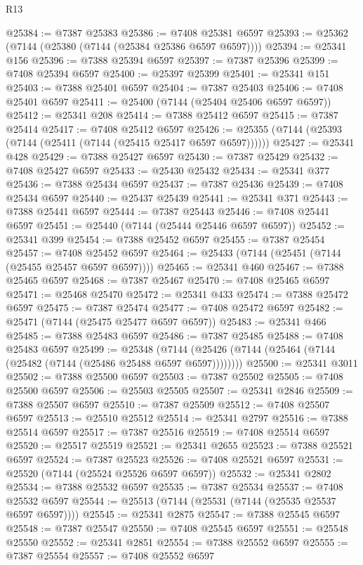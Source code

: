 \begin{lexlean}{R13}
\begin{coremodule}
@25384 := @7387 @25383
@25386 := @7408 @25381 @6597
@25393 := @25362 (@7144 (@25380 (@7144 (@25384 @25386 @6597 @6597))))
@25394 := @25341 @156
@25396 := @7388 @25394 @6597
@25397 := @7387 @25396
@25399 := @7408 @25394 @6597
@25400 := @25397 @25399
@25401 := @25341 @151
@25403 := @7388 @25401 @6597
@25404 := @7387 @25403
@25406 := @7408 @25401 @6597
@25411 := @25400 (@7144 (@25404 @25406 @6597 @6597))
@25412 := @25341 @208
@25414 := @7388 @25412 @6597
@25415 := @7387 @25414
@25417 := @7408 @25412 @6597
@25426 := @25355 (@7144 (@25393 (@7144 (@25411 (@7144 (@25415 @25417 @6597 @6597))))))
@25427 := @25341 @428
@25429 := @7388 @25427 @6597
@25430 := @7387 @25429
@25432 := @7408 @25427 @6597
@25433 := @25430 @25432
@25434 := @25341 @377
@25436 := @7388 @25434 @6597
@25437 := @7387 @25436
@25439 := @7408 @25434 @6597
@25440 := @25437 @25439
@25441 := @25341 @371
@25443 := @7388 @25441 @6597
@25444 := @7387 @25443
@25446 := @7408 @25441 @6597
@25451 := @25440 (@7144 (@25444 @25446 @6597 @6597))
@25452 := @25341 @399
@25454 := @7388 @25452 @6597
@25455 := @7387 @25454
@25457 := @7408 @25452 @6597
@25464 := @25433 (@7144 (@25451 (@7144 (@25455 @25457 @6597 @6597))))
@25465 := @25341 @460
@25467 := @7388 @25465 @6597
@25468 := @7387 @25467
@25470 := @7408 @25465 @6597
@25471 := @25468 @25470
@25472 := @25341 @433
@25474 := @7388 @25472 @6597
@25475 := @7387 @25474
@25477 := @7408 @25472 @6597
@25482 := @25471 (@7144 (@25475 @25477 @6597 @6597))
@25483 := @25341 @466
@25485 := @7388 @25483 @6597
@25486 := @7387 @25485
@25488 := @7408 @25483 @6597
@25499 := @25348
    (@7144 (@25426 (@7144 (@25464 (@7144 (@25482 (@7144 (@25486 @25488 @6597 @6597))))))))
@25500 := @25341 @3011
@25502 := @7388 @25500 @6597
@25503 := @7387 @25502
@25505 := @7408 @25500 @6597
@25506 := @25503 @25505
@25507 := @25341 @2846
@25509 := @7388 @25507 @6597
@25510 := @7387 @25509
@25512 := @7408 @25507 @6597
@25513 := @25510 @25512
@25514 := @25341 @2797
@25516 := @7388 @25514 @6597
@25517 := @7387 @25516
@25519 := @7408 @25514 @6597
@25520 := @25517 @25519
@25521 := @25341 @2655
@25523 := @7388 @25521 @6597
@25524 := @7387 @25523
@25526 := @7408 @25521 @6597
@25531 := @25520 (@7144 (@25524 @25526 @6597 @6597))
@25532 := @25341 @2802
@25534 := @7388 @25532 @6597
@25535 := @7387 @25534
@25537 := @7408 @25532 @6597
@25544 := @25513 (@7144 (@25531 (@7144 (@25535 @25537 @6597 @6597))))
@25545 := @25341 @2875
@25547 := @7388 @25545 @6597
@25548 := @7387 @25547
@25550 := @7408 @25545 @6597
@25551 := @25548 @25550
@25552 := @25341 @2851
@25554 := @7388 @25552 @6597
@25555 := @7387 @25554
@25557 := @7408 @25552 @6597

\end{coremodule}
\end{lexlean}
